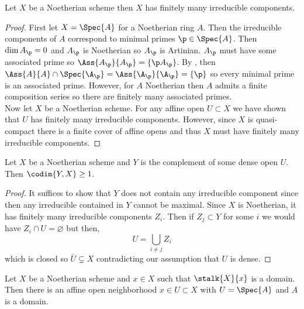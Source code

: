 \begin{lemma}
Let $X$ be a Noetherian scheme then $X$ has finitely many irreducible components.
\end{lemma}

\begin{proof}
First let $X = \Spec{A}$ for a Noetherian ring $A$. Then the irreducible components of $A$ correspond to minimal primes $\p \in \Spec{A}$. Then $\dim{A_\p} = 0$ and $A_\p$ is Noetherian so $A_\p$ is Artinian. $A_\p$ must have some associated prime so $\Ass{A_\p}{A_\p} = \{ \p A_\p \}$.  By \cite[\href{https://stacks.math.columbia.edu/tag/05BZ}{Tag 05BZ}]{stacks-project}, then $\Ass{A}{A} \cap \Spec{\A_\p} = \Ass{\A_\p}{\A_\p} = \{ \p \}$ so every minimal prime is an associated prime. However, for $A$ Noetherian then $A$ admits a finite composition series so there are finitely many associated primes.
\bigskip\\
Now let $X$ be a Noetherian scheme. For any affine open $U \subset X$ we have shown that $U$ has finitely many irreducible components. However, since $X$ is quasi-compact there is a finite cover of affine opens and thus $X$ must have finitely many irreducible components. 
\end{proof}

\begin{lemma}
Let $X$ be a Noetherian scheme and $Y$ is the complement of some dense open $U$. Then $\codim{Y, X} \ge 1$.
\end{lemma}

\begin{proof}
It suffices to show that $Y$ does not contain any irreducible component since then any irreducible contained in $Y$ cannot be maximal. Since $X$ is Noetherian, it has finitely many irreducible components $Z_i$. Then if $Z_j \subset Y$ for some $i$ we would have $Z_i \cap U = \varnothing$ but then,
\[ U = \bigcup_{i \neq j} Z_i \]
which is closed so $\overline{U} \subsetneq X$ contradicting our assumption that $U$ is dense.
\end{proof}

\begin{lemma} \label{open_domain}
Let $X$ be a Noetherian scheme and $x \in X$ such that $\stalk{X}{x}$ is a domain. Then there is an affine open neighborhood $x \in U \subset X$ with $U = \Spec{A}$ and $A$ is a domain.
\end{lemma}

